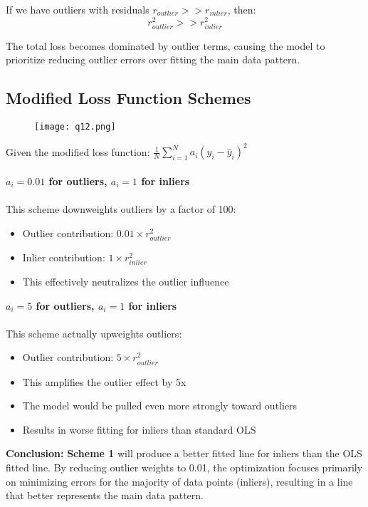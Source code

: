 \documentclass[12pt]{article}
\begin{document}
If we have outliers with residuals $r_{outlier} >> r_{inlier}$, then:
$$r_{outlier}^2 >> r_{inlier}^2$$

The total loss becomes dominated by outlier terms, causing the model to prioritize reducing outlier errors over fitting the main data pattern.

\newpage
\subsection{Modified Loss Function Schemes}
\begin{figure}[h]
    \centering
    \texttt{[image: q12.png]}
\end{figure}

Given the modified loss function: $\frac{1}{N}\sum_{i=1}^{N}a_i(y_i - \hat{y}_i)^2$\\
\\

\textbf{$a_i = 0.01$ for outliers, $a_i = 1$ for inliers}\\
\\

This scheme downweights outliers by a factor of 100:
\begin{itemize}
    \item Outlier contribution: $0.01 \times r_{outlier}^2$
    \item Inlier contribution: $1 \times r_{inlier}^2$
    \item This effectively neutralizes the outlier influence
\end{itemize}

\textbf{$a_i = 5$ for outliers, $a_i = 1$ for inliers}\\
\\
This scheme actually upweights outliers:
\begin{itemize}
    \item Outlier contribution: $5 \times r_{outlier}^2$
    \item This amplifies the outlier effect by 5x
    \item The model would be pulled even more strongly toward outliers
    \item Results in worse fitting for inliers than standard OLS
\end{itemize}

\textbf{Conclusion:} \textbf{Scheme 1} will produce a better fitted line for inliers than the OLS fitted line. By reducing outlier weights to 0.01, the optimization focuses primarily on minimizing errors for the majority of data points (inliers), resulting in a line that better represents the main data pattern.
\end{document}
